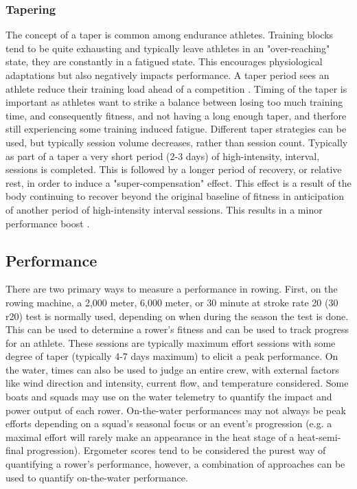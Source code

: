 \subsubsection{Tapering}
The concept of a taper is common among endurance athletes. Training blocks tend to be quite exhausting and typically leave athletes in an "over-reaching" state, they are constantly in a fatigued state. This encourages physiological adaptations but also negatively impacts performance. A taper period sees an athlete reduce their training load ahead of a competition \cite{Lawton2023}. Timing of the taper is important as athletes want to strike a balance between losing too much training time, and consequently fitness, and not having a long enough taper, and therfore still experiencing some training induced fatigue. Different taper strategies can be used, but typically session volume decreases, rather than session count. Typically as part of a taper a very short period (2-3 days) of high-intensity, interval, sessions is completed. This is followed by a longer period of recovery, or relative rest, in order to induce a "super-compensation" effect. This effect is a result of the body continuing to recover beyond the original baseline of fitness in anticipation of another period of high-intensity interval sessions. This results in a minor performance boost \cite{Kanwetz2016}.


\subsection{Performance}
There are two primary ways to measure a performance in rowing. First, on the rowing machine, a 2,000 meter, 6,000 meter, or 30 minute at stroke rate 20 (30 r20) test is normally used, depending on when during the season the test is done. This can be used to determine a rower's fitness and can be used to track progress for an athlete. These sessions are typically maximum effort sessions with some degree of taper (typically 4-7 days maximum) to elicit a peak performance. On the water, times can also be used to judge an entire crew, with external factors like wind direction and intensity, current flow, and temperature considered. Some boats and squads may use on the water telemetry to quantify the impact and power output of each rower. On-the-water performances may not always be peak efforts depending on a squad's seasonal focus or an event's progression (e.g. a maximal effort will rarely make an appearance in the heat stage of a heat-semi-final progression). Ergometer scores tend to be considered the purest way of quantifying a rower's performance, however, a combination of approaches can be used to quantify on-the-water performance.

